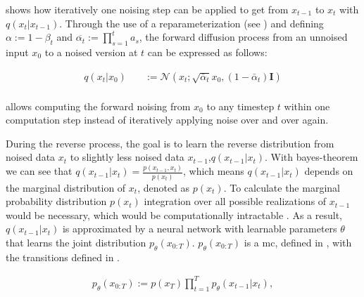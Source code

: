  \cite{ho2020DenoisingDiffusionProbabilistic} shows how iteratively one noising step can be applied to get from $x_{t-1}$ to $x_t$ with $q(x_t | x_{t-1})$.
Through the use of a reparameterization (see ) and defining $\alpha := 1-\beta_t$ and $\overline{\alpha_t}:=\prod_{s=1}^{t}a_s$, 
the forward diffusion process from an unnoised input $x_0$ to a noised version at $t$ can be expressed as follows:

\begin{equation}
  \label{eqn:forwards_2}
  \begin{align*}
    q(x_t | x_0) \quad & := \mathcal{N}(x_t; \sqrt{\bar{\alpha}_t} x_0, (1 - \bar{\alpha}_t) \textbf{I})\\
  \end{align*}
\end{equation}

 \cite{ho2020DenoisingDiffusionProbabilistic} allows computing the forward noising from $x_0$ to any timestep $t$ within one computation step instead of iteratively applying noise over and over again.
\newline

During the reverse process, the goal is to learn the reverse distribution from noised data $x_t$ to slightly less noised data $x_{t-1}$,\ie $q(x_{t-1}|x_t)$.
With bayes-theorem we can see that $q(x_{t-1}|x_t) = \frac{p(x_{t-1},x_t)}{p(x_t)}$, which means $q(x_{t-1}|x_t)$ depends on the marginal distribution of $x_t$, denoted as $p(x_t)$.
To calculate the marginal probability distribution $p(x_t)$ integration over all possible realizations of $x_{t-1}$ would be necessary, which would be computationally intractable \cite{capel2022MasterThesisDenoising}.
As a result, $q(x_{t-1}|x_t)$ is approximated by a neural network with learnable parameters $\theta$ that learns the joint distribution $p_{\theta}(x_{0:T})$.
$p_{\theta}(x_{0:T})$ is a \gls{mc}, defined in , with the transitions defined in  \cite{capel2022MasterThesisDenoising, ho2020DenoisingDiffusionProbabilistic}.

\begin{equation}
  \label{eqn:reverse_1}
  \begin{align*}
    p_{\theta}(x_{0:T}) := p(x_T) \prod_{t=1}^T p_{\theta}(x_{t-1} | x_t),
  \end{align*}
\end{equation}

